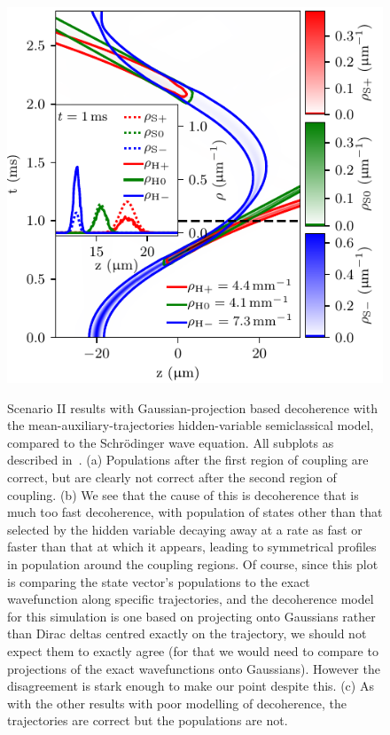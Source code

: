{\begin{figure}
{    \includegraphics{figures/hidden_variables/hvsc_aux_mirror_very_bad_gamma/trajectories.pdf}
    }
    \caption{Scenario II results with Gaussian-projection based decoherence with the mean-auxiliary-trajectories hidden-variable semiclassical model, compared to the Schr\"odinger wave equation. All subplots as described in~. (a) Populations after the first region of coupling are correct, but are clearly not correct after the second region of coupling. (b) We see that the cause of this is decoherence that is much too fast decoherence, with population of states other than that selected by the hidden variable decaying away at a rate as fast or faster than that at which it appears, leading to symmetrical profiles in population around the coupling regions. Of course, since this plot is comparing the state vector's populations to the exact wavefunction along specific trajectories, and the decoherence model for this simulation is one based on projecting onto Gaussians rather than Dirac deltas centred exactly on the trajectory, we should not expect them to exactly agree (for that we would need to compare to projections of the exact wavefunctions onto Gaussians). However the disagreement is stark enough to make our point despite this. (c) As with the other results with poor modelling of decoherence, the trajectories are correct but the populations are not.}\label{fig:very_bad_gamma}
\end{figure}
\restoregeometry}

